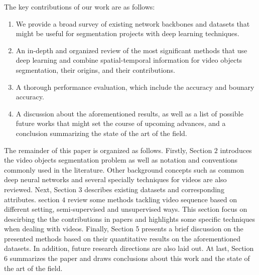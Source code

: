 The key contributions of our work are as follows:
\begin{enumerate}
    \item  We provide a broad survey of existing network backbones and datasets that might be useful for segmentation projects with deep learning techniques.
    \item  An in-depth and organized review of the most signiﬁcant methods that use deep learning and combine spatial-temporal information for video objects segmentation, 
           their origins, and their contributions.
    \item  A thorough performance evaluation, which include the accuracy and bounary accuracy.
    \item  A discussion about the aforementioned results, as well as a list of possible future works that might set the course of upcoming advances,
           and a conclusion summarizing the state of the art of the ﬁeld.
    
\end{enumerate}

The remainder of this paper is organized as follows. Firstly, Section $2$ introduces the video objects segmentation problem as well as notation and conventions commonly used in the literature.
Other background concepts such as common deep neural networks and several specially techniques for videos are also reviewed. Next, Section 3 describes existing datasets and corresponding attributes.
section $4$ review some methods tackling video sequence based on different setting, semi-supervised and unsupervised ways. This section focus on descirbing the the contributions in papers and highlights some
specific techniques when dealing with videos. Finally, Section 5 presents a brief discussion on the presented methods based on their quantitative results on the aforementioned datasets. 
In addition, future research directions are also laid out. At last, Section 6 summarizes the paper and draws conclusions about this work and the state of the art of the ﬁeld.